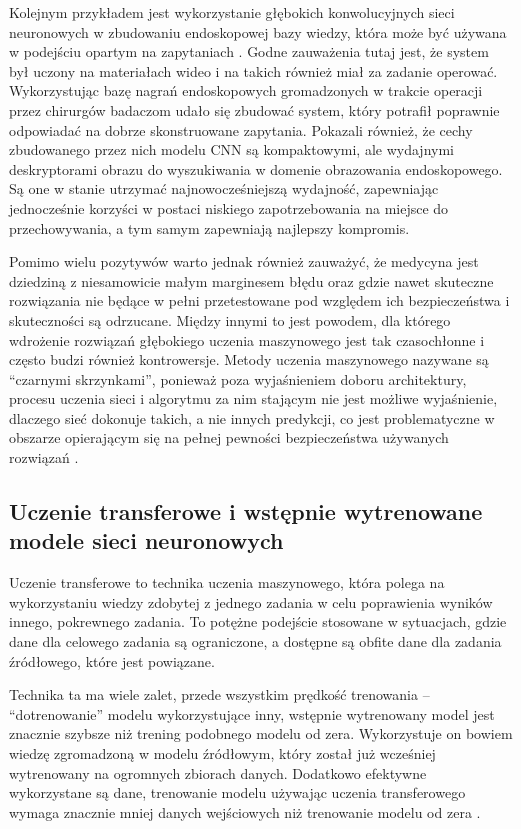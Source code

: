 Kolejnym przykładem jest wykorzystanie głębokich konwolucyjnych sieci neuronowych w zbudowaniu endoskopowej bazy wiedzy, która może być używana w podejściu opartym na zapytaniach \cite{petscharnig2018binary}.
Godne zauważenia tutaj jest, że system był uczony na materiałach wideo i na takich również miał za zadanie operować.
Wykorzystując bazę nagrań endoskopowych gromadzonych w trakcie operacji przez chirurgów badaczom udało się zbudować system, który potrafił poprawnie odpowiadać na dobrze skonstruowane zapytania.
Pokazali również, że cechy zbudowanego przez nich modelu CNN są kompaktowymi, ale wydajnymi deskryptorami obrazu do wyszukiwania w domenie obrazowania endoskopowego.
Są one w stanie utrzymać najnowocześniejszą wydajność, zapewniając jednocześnie korzyści w postaci niskiego zapotrzebowania na miejsce do przechowywania, a tym samym zapewniają najlepszy kompromis.

Pomimo wielu pozytywów warto jednak również zauważyć, że medycyna jest dziedziną z niesamowicie małym marginesem błędu oraz gdzie nawet skuteczne rozwiązania nie będące w pełni przetestowane pod względem ich bezpieczeństwa i skuteczności są odrzucane.
Między innymi to jest powodem, dla którego wdrożenie rozwiązań głębokiego uczenia maszynowego jest tak czasochłonne i często budzi również kontrowersje.
Metody uczenia maszynowego nazywane są ``czarnymi skrzynkami'', ponieważ poza wyjaśnieniem doboru architektury, procesu uczenia sieci i algorytmu za nim stającym nie jest możliwe wyjaśnienie, dlaczego sieć dokonuje takich, a nie innych predykcji, co jest problematyczne w obszarze opierającym się na pełnej pewności bezpieczeństwa używanych rozwiązań \cite{pouyanfar2018survey}.

\subsection{Uczenie transferowe i wstępnie wytrenowane modele sieci neuronowych}

Uczenie transferowe to technika uczenia maszynowego, która polega na wykorzystaniu wiedzy zdobytej z jednego zadania w celu poprawienia wyników innego, pokrewnego zadania.
To potężne podejście stosowane w sytuacjach, gdzie dane dla celowego zadania są ograniczone, a dostępne są obfite dane dla zadania źródłowego, które jest powiązane.

Technika ta ma wiele zalet, przede wszystkim prędkość trenowania -- ``dotrenowanie'' modelu wykorzystujące inny, wstępnie wytrenowany model jest znacznie szybsze niż trening podobnego modelu od zera.
Wykorzystuje on bowiem wiedzę zgromadzoną w modelu źródłowym, który został już wcześniej wytrenowany na ogromnych zbiorach danych.
Dodatkowo efektywne wykorzystane są dane, trenowanie modelu używając uczenia transferowego wymaga znacznie mniej danych wejściowych niż trenowanie modelu od zera \cite{weiss2016survey}.


